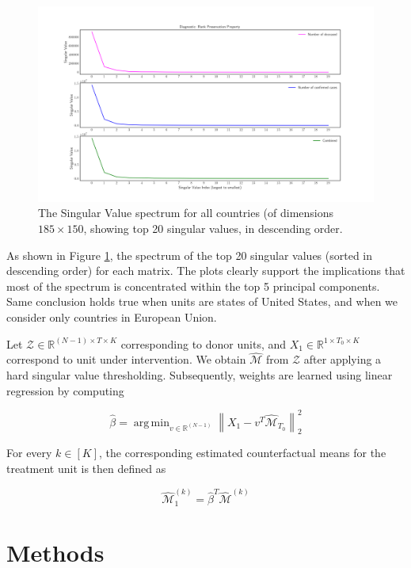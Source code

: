 \documentclass[preprint,authoryear,12pt]{elsarticle}
\DeclareMathOperator*{\argmin}{arg\,min}
\begin{document}
\begin{figure}[ht]
	\includegraphics[width=\textwidth]{rd}
	\caption{The Singular Value spectrum for all countries (of dimensions $185 \times 150$, showing top 20 singular values, in descending order.} 
	\label{fig1} 
\end{figure}

As shown in Figure \ref{fig1}, the spectrum of the top 20 singular values (sorted in descending order) for each matrix. The plots clearly support the implications that most of the spectrum is concentrated within the top 5 principal components. Same conclusion holds true when units are states of United States, and when we consider only countries in European Union.\par

Let $\mathcal{Z} \in \mathbb{R}^{(N-1) \times T \times K}$ corresponding to donor units, and $X_1 \in \mathbb{R}^{1 \times T_0 \times K}$ correspond to unit under intervention. We obtain $\hat{\mathcal{M}}$ from $\mathcal{Z}$ after applying a hard singular value thresholding. Subsequently, weights are learned using linear regression by computing

\begin{equation*}
\hat{\beta} = \argmin_{v \in \mathbb{R}^{(N-1)} } \left\| X_1 - v^T \hat{\mathcal{M}}_{T_0}\right\|^2_2
\end{equation*}

For every $k \in [K]$, the corresponding estimated counterfactual means for the treatment unit is then defined as

\begin{equation*}
\hat{\mathcal{M}}_1^{(k)} = \hat{\beta}^T \hat{\mathcal{M}}^{(k)}
\end{equation*}

\section{Methods}
\label{SEC2}
\end{document}

